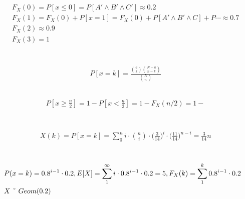 \documentclass[a4paper]{article}
\begin{document}
\subsection{}
\begin{align*}
& F_X(0) = P[x \le 0] = P[A' \wedge B' \wedge C'] \approx 0.2 \\
& F_X(1) = F_X(0) + P[x = 1] = F_X(0) + P[A' \wedge B' \wedge C] + P \cdots \approx 0.7 \\
& F_X(2) \approx 0.9 \\
& F_X(3) = 1
\end{align*}

\section{}
\subsection{}
\begin{align*}
& P[x = k] = \frac{{a \choose k} {N-a \choose n-k} }{{N \choose n}}
\end{align*}
\subsection{}
\begin{align*}
& P[x \ge \frac{n}{2}] = 1 - P[x < \frac{n}{2}] = 1 - F_X(n/2) = 1 -  
\end{align*}
\section{}
\begin{align*}
& X(k) = P[x = k] = \sum_0^n i \cdot {n \choose i} \cdot  \big(\frac{3}{14}\big)^i \cdot \big(\frac{11}{14}\big)^{n-i} = \frac{3}{14}n
\end{align*}

\section{}
\subsection{}
\begin{align*}
& P(x = k) = 0.8^{i-1}\cdot 0.2, E[X] = \sum_1^\infty i\cdot 0.8^{i-1}\cdot 0.2 = 5, F_X(k) = \sum_1^k 0.8^{i-1}\cdot 0.2 \\
& X \tilde{\hspace{0.4cm} } Geom(0.2)
\end{align*}
\end{document}
